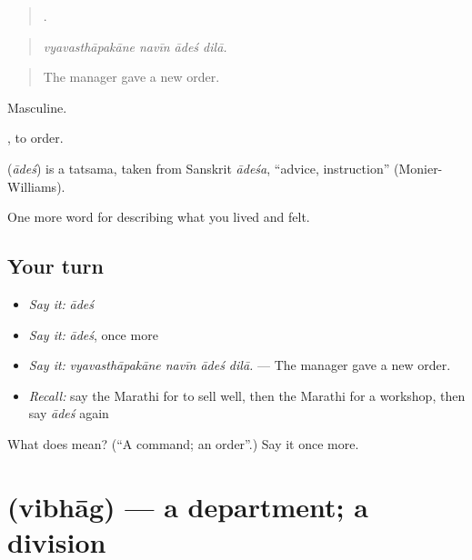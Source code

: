 \begin{quote}
   .
\end{quote}

\begin{quote}
\emph{vyavasthāpakāne navīn ādeś dilā.}
\end{quote}

\begin{quote}
The manager gave a new order.
\end{quote}

Masculine.

 , to order.

\begin{cousinweb}
\textbf{} (\emph{ādeś}) is a tatsama, taken from Sanskrit \emph{ādeśa}, \textquotedblleft{}advice, instruction\textquotedblright{} (Monier-Williams).
\end{cousinweb}

\begin{grammarlens}[title={What you've built}]
One more word for describing what you lived and felt.
\end{grammarlens}

\subsection*{Your turn}
\begin{itemize}
\raggedright
  \item \emph{Say it:} \emph{ādeś}
  \item \emph{Say it:} \emph{ādeś}, once more
  \item \emph{Say it:} \emph{vyavasthāpakāne navīn ādeś dilā.} — The manager gave a new order.
  \item \emph{Recall:} say the Marathi for to sell well, then the Marathi for a workshop, then say \emph{ādeś} again
\end{itemize}

\begin{tcolorbox}[breakable,colback=teal!4,colframe=teal!35!black,title={Before you move on}]
What does  mean? (\textquotedblleft{}A command; an order\textquotedblright{}.) Say it once more.
\end{tcolorbox}
\section[\texorpdfstring{\mr{विभाग} (vibhāg)}{विभाग (vibhāg)}]{ (vibhāg) — a department; a division}

